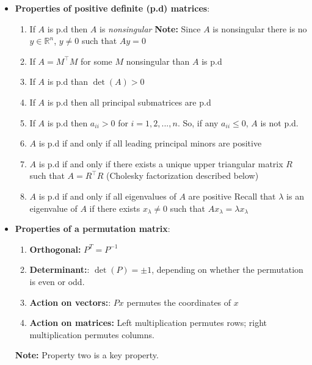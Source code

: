 \documentclass{report}
\begin{document}
\begin{itemize}
        \item \textbf{Properties of positive definite (p.d) matrices}:
            \begin{enumerate}
                \item If $A$ is p.d then $A$ is \textit{nonsingular}
                    \bigbreak \noindent 
                    \textbf{Note:} Since $A$ is nonsingular there is no $y \in \mathbb{R}^{n}$, $y\ne 0$ such that $Ay = 0$
                \item If $A = M^{\top}M$ for some $M$ nonsingular than $A$ is p.d
                \item If $A$ is p.d than $\det(A) > 0$
                \item If $A$ is p.d then all principal submatrices are p.d
                \item If $A$ is p.d then $a_{ii}>0$ for $i=1,2,...,n$. So, if any $a_{ii} \leq 0$, $A$ is not p.d.
                \item $A$ is p.d if and only if all leading principal minors are positive
                \item $A$ is p.d if and only if there exists a unique upper triangular matrix $R$ such that $A = R^{\top}R$ (Cholesky factorization described below)
                \item $A$ is p.d if and only if all eigenvalues of $A$ are positive
                    \bigbreak \noindent 
                    Recall that $\lambda$ is an eigenvalue of $A$ if there exists $x_{\lambda} \ne 0$ such that $Ax_{\lambda}  = \lambda x_{\lambda}$
            \end{enumerate}
     \item \textbf{Properties of a permutation matrix}:
        \begin{enumerate}
            \item \textbf{Orthogonal:} $P^{T} = P^{-1} $
            \item \textbf{Determinant:}: $\det(P)=\pm 1$, depending on whether the permutation is even or odd.
            \item \textbf{Action on vectors:}: $Px$ permutes the coordinates of $x$
            \item \textbf{Action on matrices:} Left multiplication permutes rows; right multiplication permutes columns.
        \end{enumerate}
           \textbf{Note:} Property two is a key property.

    \end{itemize}
\end{document}
